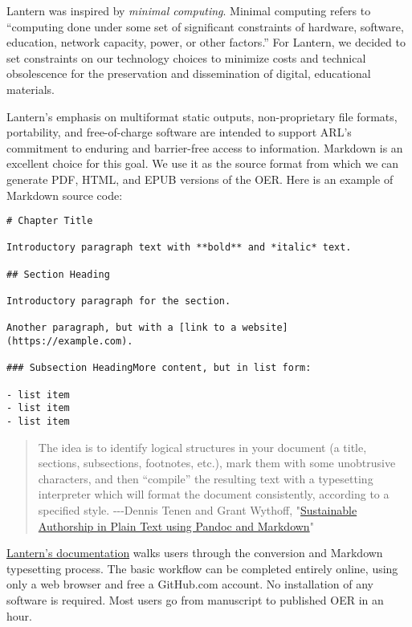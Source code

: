 \documentclass{book}
\begin{document}
Lantern was inspired by \emph{minimal computing}. Minimal computing refers to
``computing done under some set of significant constraints of hardware,
software, education, network capacity, power, or other factors.'' For Lantern,
we decided to set constraints on our technology choices to minimize costs and
technical obsolescence for the preservation and dissemination of digital,
educational materials.

Lantern's emphasis on multiformat static outputs, non-proprietary file
formats, portability, and free-of-charge software are intended to support
ARL's commitment to enduring and barrier-free access to information. Markdown
is an excellent choice for this goal. We use it as the source format from
which we can generate PDF, HTML, and EPUB versions of the OER. Here is an
example of Markdown source code:

\begin{verbatim}
# Chapter Title

Introductory paragraph text with **bold** and *italic* text.

## Section Heading

Introductory paragraph for the section.

Another paragraph, but with a [link to a website](https://example.com).

### Subsection HeadingMore content, but in list form:

- list item
- list item
- list item
\end{verbatim}

\begin{quote}
The idea is to identify logical structures in your document (a title,
sections, subsections, footnotes, etc.), mark them with some unobtrusive
characters, and then ``compile'' the resulting text with a typesetting
interpreter which will format the document consistently, according to a
specified style. -\/-\/-Dennis Tenen and Grant Wythoff,
"\href{https://programminghistorian.org/en/lessons/sustainable-authorship-in-plain-text-using-pandoc-and-markdown}{Sustainable
Authorship in Plain Text using Pandoc and Markdown}"
\end{quote}

\href{https://github.com/nulib-oer/lantern/wiki}{Lantern's documentation}
walks users through the conversion and Markdown typesetting process. The basic
workflow can be completed entirely online, using only a web browser and free a
GitHub.com account. No installation of any software is required. Most users go
from manuscript to published OER in an hour.
\end{document}

